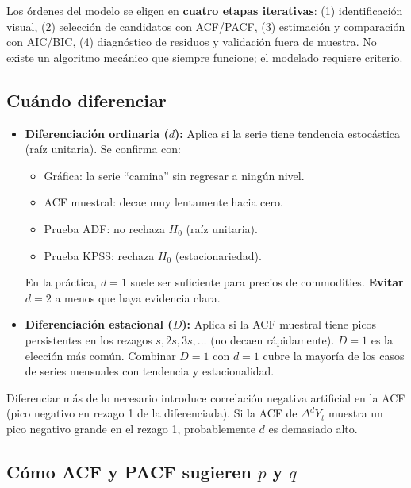 \documentclass[12pt,a4paper]{article}
\theoremstyle{definition}
\begin{document}
Los órdenes del modelo se eligen en \textbf{cuatro etapas iterativas}:
(1) identificación visual, (2) selección de candidatos con ACF/PACF,
(3) estimación y comparación con AIC/BIC, (4) diagnóstico de residuos y
validación fuera de muestra. No existe un algoritmo mecánico que siempre
funcione; el modelado requiere criterio.

\subsection{Cuándo diferenciar}

\begin{itemize}
  \item \textbf{Diferenciación ordinaria ($d$):} Aplica si la serie tiene
        tendencia estocástica (raíz unitaria). Se confirma con:
        \begin{itemize}[nosep]
          \item Gráfica: la serie ``camina'' sin regresar a ningún nivel.
          \item ACF muestral: decae muy lentamente hacia cero.
          \item Prueba ADF: no rechaza $H_0$ (raíz unitaria).
          \item Prueba KPSS: rechaza $H_0$ (estacionariedad).
        \end{itemize}
        En la práctica, $d=1$ suele ser suficiente para precios de commodities.
        \textbf{Evitar $d=2$} a menos que haya evidencia clara.

  \item \textbf{Diferenciación estacional ($D$):} Aplica si la ACF muestral
        tiene picos persistentes en los rezagos $s, 2s, 3s, \ldots$
        (no decaen rápidamente). $D=1$ es la elección más común.
        Combinar $D=1$ con $d=1$ cubre la mayoría de los casos de series
        mensuales con tendencia y estacionalidad.
\end{itemize}

\begin{warnbox}
Diferenciar más de lo necesario introduce correlación negativa artificial en la
ACF (pico negativo en rezago 1 de la diferenciada). Si la ACF de $\Delta^d Y_t$
muestra un pico negativo grande en el rezago 1, probablemente $d$ es demasiado
alto.
\end{warnbox}

\subsection{Cómo ACF y PACF sugieren $p$ y $q$}
\end{document}
